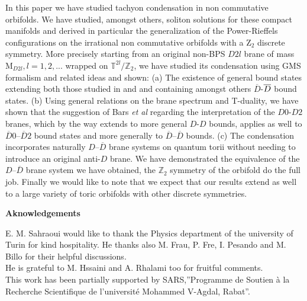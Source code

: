 \documentclass[a4paper,12pt]{article}
\begin{document}
In this paper we have studied tachyon condensation in non
commutative orbifolds. We have studied, amongst others, soliton
solutions for these compact manifolds and derived in particular
the generalization of the Power-Rieffels configurations on the
irrational non commutative orbifolds with a Z$_{2}$ discrete
symmetry. More precisely starting from an original non-BPS $D2l$
brane of mass M$_{D2l},l=1,2,...$ wrapped on
$\mathbb{T}^{2l}/\mathbb{Z}_{2}$, we have studied its condensation
using GMS formalism and related ideas and shown: (a) The existence
of general bound states extending both those
studied in \cite{g} and \cite{j} and containing amongst others $\overline{D}$-$\overline{%
D}$ bound states. (b) Using general relations on the brane
spectrum and T-duality, we have shown that the suggestion of Bars
{\it et al} regarding the interpretation of the $D0$-$D2$ branes,
which by the way extends to more general $D$-$D$ bounds, applies
as well to $\overline{D}0$--$\overline{D}2$ bound states and more
generally to $\overline{D}$--$\overline{D}$ bounds. (c) The
condensation incorporates naturally $D$--$\overline{D}$ brane
systems on quantum torii without needing to introduce an original
anti-$D$ brane. We have demonstrated the equivalence of the
$D$--$\overline{D}$ brane system we have obtained, the
$\mathbb{Z}_2$ symmetry of the orbifold do the full job. Finally
we would like to note that we expect that our results extend as
well to a large variety of toric orbifolds with other discrete
symmetries.\\

\vskip 1cm
\centerline{\large\bf{Aknowledgements}}

E. M. Sahraoui would like to thank the Physics department of the
university of Turin  for kind hospitality. He thanks also M. Frau,
P. Fre, I. Pesando and M. Billo for their helpful discussions.\\
He is grateful to M. Hssaini and A. Rhalami too for fruitful
comments.\\
 This work has been partially supported by SARS,''Programme
de Soutien \`{a} la Recherche Scientifique de l'universit\'{e}
Mohammed V-Agdal, Rabat''.\\
\newpage
\end{document}
